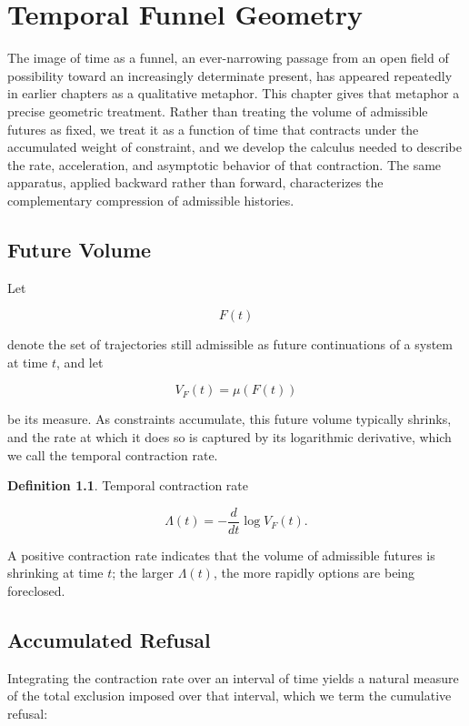 \documentclass[11pt,oneside]{book}
\theoremstyle{plain}
\theoremstyle{definition}
\newtheorem{definition}[theorem]{Definition}
\theoremstyle{remark}
\begin{document}
\chapter{Temporal Funnel Geometry}

The image of time as a funnel, an ever-narrowing passage from an open field of possibility toward an increasingly determinate present, has appeared repeatedly in earlier chapters as a qualitative metaphor. This chapter gives that metaphor a precise geometric treatment. Rather than treating the volume of admissible futures as fixed, we treat it as a function of time that contracts under the accumulated weight of constraint, and we develop the calculus needed to describe the rate, acceleration, and asymptotic behavior of that contraction. The same apparatus, applied backward rather than forward, characterizes the complementary compression of admissible histories.

\section{Future Volume}

Let

\[
F(t)
\]

denote the set of trajectories still admissible as future continuations of a system at time \(t\), and let

\[
V_F(t)
=
\mu(F(t))
\]

be its measure. As constraints accumulate, this future volume typically shrinks, and the rate at which it does so is captured by its logarithmic derivative, which we call the temporal contraction rate.

\begin{definition}
Temporal contraction rate

\[
\Lambda(t)
=
-
\frac{d}{dt}
\log V_F(t).
\]
\end{definition}

A positive contraction rate indicates that the volume of admissible futures is shrinking at time \(t\); the larger \(\Lambda(t)\), the more rapidly options are being foreclosed.

\section{Accumulated Refusal}

Integrating the contraction rate over an interval of time yields a natural measure of the total exclusion imposed over that interval, which we term the cumulative refusal:
\end{document}
